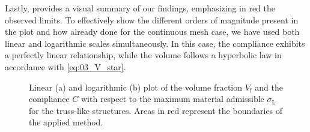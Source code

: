Lastly,  provides a visual summary of our findings, emphasizing in red the observed limits. To effectively show the different orders of magnitude present in the plot and how already done for the continuous mesh case, we have used both linear and logarithmic scales simultaneously. In this case, the compliance exhibits a perfectly linear relationship, while the volume follows a hyperbolic law in accordance with \eqref{eq:03_V_star}.

\begin{figure}
    \hspace*{\fill}
    \hfill
    \hspace*{\fill}
    \caption{Linear (a) and logarithmic (b) plot of the volume fraction $V_\text{f}$ and the compliance $C$ with respect to the maximum material admissible $\sigma_\text{L}$ for the truss-like structures. Areas in red represent the boundaries of the applied method.}
    \label{fig:03_tto_plot}
\end{figure}

